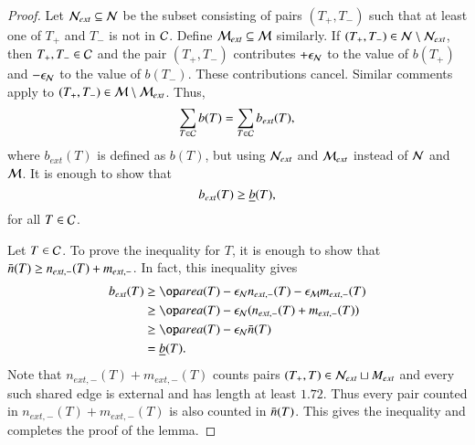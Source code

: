 \begin{proof}
  Let $\mathcal N_{ext}\subseteq \mathcal N$ be the subset consisting of pairs
  $(T_+,T_-)$ such that at least one of $T_+$ and $T_-$ is not in
  $\mathcal C$.  Define $\mathcal M_{ext}\subseteq \mathcal M$ similarly.  If $(T_+,T_-)\in
  \mathcal N\setminus \mathcal N_{ext}$, then $T_+,T_-\in\mathcal C$ and the pair $(T_+,T_-)$
  contributes $+\epsilon_{\mathcal N}$ to the value of $b(T_+)$ and $-\epsilon_{\mathcal N}$ to the
  value of $b(T_-)$.  These contributions cancel.  Similar comments
  apply to $(T_+,T_-)\in\mathcal M\setminus \mathcal M_{ext}$.  Thus,
\[
\sum_{T\in \mathcal C} b(T) = \sum_{T\in \mathcal C} b_{ext}(T),
\]
where $b_{ext}(T)$ is defined as $b(T)$, but using $\mathcal N_{ext}$ and
$\mathcal M_{ext}$ instead of $\mathcal N$ and $\mathcal M$. It is enough to show that
\[
b_{ext}(T) \ge \underline{b}(T),
\]
for all $T\in\mathcal C$.

Let $T\in\mathcal C$.  To prove the inequality for $T$, it is enough to show
that $\bar n(T)\ge n_{ext,-}(T)+m_{ext,-}$.  In fact, this inequality gives
\begin{align*}
b_{ext}(T) &\ge \area(T) - \epsN n_{ext,-}(T) - \epsM m_{ext,-}(T) \\
&\ge \area(T) - \epsN (n_{ext,-}(T)+m_{ext,-}(T)) \\
&\ge \area(T) - \epsN \tn(T)\\
&= \tb(T).
\end{align*}
Note that $n_{ext,-}(T)+m_{ext,-}(T)$ counts pairs
$(T_+,T)\in\mathcal N_{ext}\sqcup M_{ext}$ and every such shared edge is
external and has length at least $1.72$.  Thus every pair counted in
$n_{ext,-}(T)+m_{ext,-}(T)$ is also counted in $\bar n(T)$.  This gives
the inequality and completes the proof of the lemma.
\end{proof}

